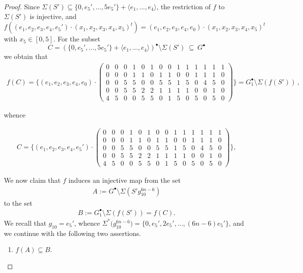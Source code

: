\documentclass[a4paper, 10pt]{amsart}
\theoremstyle{plain}
\theoremstyle{definition}
\numberwithin{equation}{section}
\begin{document}
{\begin{proof}
Since $\Sigma(S')\subseteq \{0,e_5',...,5e_5'\}+ \langle e_1,...,e_4\rangle$, the restriction of $f$ to $\Sigma(S')$ is injective, and 
\[
f\left( (e_1,e_2,e_3,e_4,e_5')\cdot (x_1,x_2,x_3,x_4,x_5)^t\right) =(e_1,e_2,e_3,e_4,e_0)\cdot (x_1,x_2,x_3,x_4,x_5)^t
\]
with $x_5\in [0,5]$. For the subset
$$C = (\{0,e_5',...,5e_5'\}+ \langle e_1,...,e_4\rangle)^{\bullet} \setminus \Sigma(S') \ \subseteq \ G^{\bullet}$$
we obtain that
\begin{align*}
f(C)=
\{(e_1,e_2,e_3,e_4,e_0)\cdot 
\left(\begin{array}{l|l|l|l|l|l|l|l|l|l|l|l|l|l}
	0 & 0 & 0 & 1 & 0 & 1 & 0 & 0 & 1 & 1 & 1 & 1 & 1 & 1\\
	0 & 0 & 0 & 1 & 1 & 0 & 1 & 1 & 0 & 0 & 1 & 1 & 1 & 0\\
	0 & 0 & 5 & 5 & 0 & 0 & 5 & 5 & 1 & 5 & 0 & 4 & 5 & 0\\
	0 & 0 & 5 & 5 & 2 & 2 & 1 & 1 & 1 & 1 & 0 & 0 & 1 & 0\\
	4 & 5 & 0 & 0 & 5 & 5 & 0 & 1 & 5 & 0 & 5 & 0 & 5 & 0
\end{array}\right)
\} = G_1^{\bullet} \setminus \Sigma (f(S')) \,,
\end{align*}

whence

\begin{align*}
C=
\{(e_1,e_2,e_3,e_4,e_5')\cdot 
\left(\begin{array}{l|l|l|l|l|l|l|l|l|l|l|l|l|l}
	0 & 0 & 0 & 1 & 0 & 1 & 0 & 0 & 1 & 1 & 1 & 1 & 1 & 1\\
	0 & 0 & 0 & 1 & 1 & 0 & 1 & 1 & 0 & 0 & 1 & 1 & 1 & 0\\
	0 & 0 & 5 & 5 & 0 & 0 & 5 & 5 & 1 & 5 & 0 & 4 & 5 & 0\\
	0 & 0 & 5 & 5 & 2 & 2 & 1 & 1 & 1 & 1 & 0 & 0 & 1 & 0\\
	4 & 5 & 0 & 0 & 5 & 5 & 0 & 1 & 5 & 0 & 5 & 0 & 5 & 0
\end{array}\right)
\},
\end{align*}


We now claim that $f$ induces an injective map from the set 
\begin{align*}
A := G^\bullet \setminus \Sigma\left(S' g_{10}^{6n-6}\right)
\end{align*}
to the set
\begin{align*}
B := G_1^\bullet \setminus \Sigma\left(f(S')\right) = f(C).
\end{align*}
We  recall that $g_{10} = e_5'$, whence $\Sigma^* \big( g_{10}^{6n-6} \big) = \{0, e_5', 2e_5', \dots, (6n-6)e_5'\}$, and we continue with the following two assertions.
\begin{enumerate}
\item[{\bf A1.}\,] $f (A) \subseteq B$.


\end{enumerate}
\end{proof}}
\end{document}
